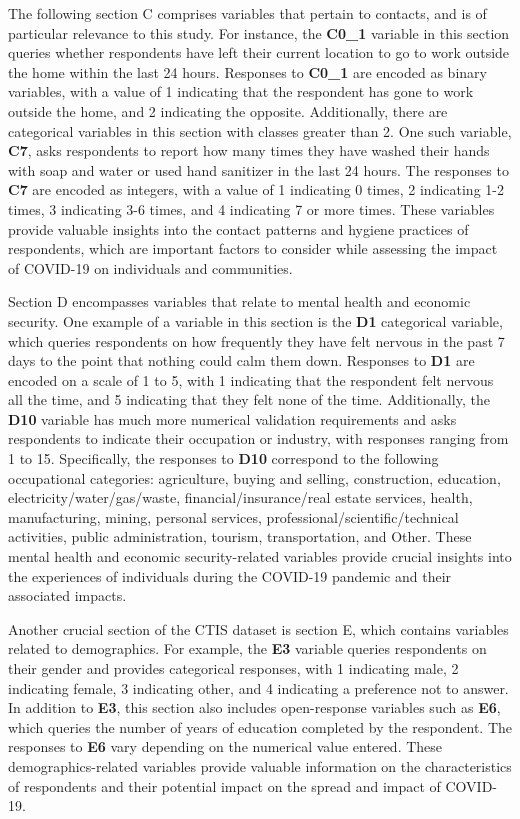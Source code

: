 The following section C comprises variables that pertain to contacts, and is of particular relevance to this study. For instance, the \textbf{C0\_1} variable in this section queries whether respondents have left their current location to go to work outside the home within the last 24 hours. Responses to \textbf{C0\_1} are encoded as binary variables, with a value of 1 indicating that the respondent has gone to work outside the home, and 2 indicating the opposite. Additionally, there are categorical variables in this section with classes greater than 2. One such variable, \textbf{C7}, asks respondents to report how many times they have washed their hands with soap and water or used hand sanitizer in the last 24 hours. The responses to \textbf{C7} are encoded as integers, with a value of 1 indicating 0 times, 2 indicating 1-2 times, 3 indicating 3-6 times, and 4 indicating 7 or more times. These variables provide valuable insights into the contact patterns and hygiene practices of respondents, which are important factors to consider while assessing the impact of COVID-19 on individuals and communities.

Section D encompasses variables that relate to mental health and economic security. One example of a variable in this section is the \textbf{D1} categorical variable, which queries respondents on how frequently they have felt nervous in the past 7 days to the point that nothing could calm them down. Responses to \textbf{D1} are encoded on a scale of 1 to 5, with 1 indicating that the respondent felt nervous all the time, and 5 indicating that they felt none of the time. Additionally, the \textbf{D10} variable has much more numerical validation requirements and asks respondents to indicate their occupation or industry, with responses ranging from 1 to 15. Specifically, the responses to \textbf{D10} correspond to the following occupational categories: agriculture, buying and selling, construction, education, electricity/water/gas/waste, financial/insurance/real estate services, health, manufacturing, mining, personal services, professional/scientific/technical activities, public administration, tourism, transportation, and Other. These mental health and economic security-related variables provide crucial insights into the experiences of individuals during the COVID-19 pandemic and their associated impacts.

Another crucial section of the CTIS dataset is section E, which contains variables related to demographics. For example, the \textbf{E3} variable queries respondents on their gender and provides categorical responses, with 1 indicating male, 2 indicating female, 3 indicating other, and 4 indicating a preference not to answer. In addition to \textbf{E3}, this section also includes open-response variables such as \textbf{E6}, which queries the number of years of education completed by the respondent. The responses to \textbf{E6} vary depending on the numerical value entered. These demographics-related variables provide valuable information on the characteristics of respondents and their potential impact on the spread and impact of COVID-19.

